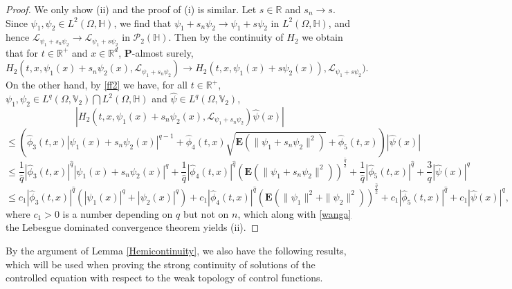 \documentclass[11pt]{article}
\newcommand{\be}{\begin{equation}}
\newcommand{\ee}{\end{equation}}
\numberwithin{equation}{section}
\begin{document}
\begin{proof}
We only show (ii) and the proof of (i) is
similar.
 Let $s\in\mathbb{R}$ and $s_n \to s$. Since
 $\psi_1,\psi_2\in
  L^2(\Omega, \mathbb{H})$, we find that
  $\psi_1+s_n  \psi_2
  \to \psi_1+s  \psi_2 $ in
  $L^2(\Omega, \mathbb{H})$,
and hence
  $\mathcal{L}_{
  \psi_1+s_n  \psi_2}
  \to
  \mathcal{L}_{
  \psi_1+s  \psi_2}$ in $\mathcal{P}_2 (\mathbb{H})$.
  Then by the continuity of
  $H_2$ we obtain that for  $t\in \mathbb{R}^+$
  and
  $x\in \mathbb{R}^d$,
  $\mathbf{P}$-almost surely,
\be\label{wanga}
  H_2 (t,x , \psi_1(x) +s_n  \psi_2(x),
  \mathcal{L}_{\psi_1+s_n  \psi_2})
  \to    H_2 (t,x , \psi_1(x)+s  \psi_2(x)  ),
  \mathcal{L}_{\psi_1+s  \psi_2 }).
\ee
On the other hand, by \eqref{ff2} we have, for all $t\in\mathbb{R}^+$,
  $\psi_1,\psi_2\in
  L^q(\Omega, \mathbb{V}_2)
  \bigcap
  L^2(\Omega, \mathbb{H})$
  and
    $\widehat{\psi} \in
    L^q(\Omega,  \mathbb{V}_2)$,
$$
\left | H_2 (t,x , \psi_1(x) +s_n  \psi_2(x),
  \mathcal{L}_{\psi_1+s_n  \psi_2})
  \widehat{\psi} (x)\right |
  $$
  $$
  \le
  \left (
   \widehat{\phi}_3 (t,x)
   |\psi_1(x) +s_n  \psi_2(x) |^{q-1}
   +
     \widehat{\phi}_4 (t,x)
     \sqrt{\mathbf{E}
     (\| \psi_1 +s_n  \psi_2\|^2)}
     +   \widehat{\phi}_5 (t,x)
  \right ) |   \widehat{\psi} (x)|
  $$
   $$
  \le
   {\frac 1{\widehat{q}}}
   |\widehat{\phi}_3 (t,x)|^{\widehat{q}}
   |\psi_1(x) +s_n  \psi_2(x) |^{q}
   +  {\frac 1{\widehat{q}}}
    | \widehat{\phi}_4 (t,x)|^{\widehat{q}}
    (  \mathbf{E}
       (\| \psi_1 +s_n  \psi_2\|^2) ) ^{\frac {\widehat{q}}2}
     +    {\frac 1{\widehat{q}}}
 |   \widehat{\phi}_5 (t,x)|^{\widehat{q}}
  +    {\frac 3{ {q}}}
   |   \widehat{\psi} (x)|^q
  $$
  $$
  \le
   c_1
   |\widehat{\phi}_3 (t,x)|^{\widehat{q}}
   (
   |\psi_1(x)|^q + | \psi_2(x) |^{q})
   + c_1
    | \widehat{\phi}_4 (t,x)|^{\widehat{q}}
    ( \mathbf{E}
     (\| \psi_1\|^2
      + \| \psi_2\|^2 ) ) ^{\frac {\widehat{q}}2}
     +   c_1
 |   \widehat{\phi}_5 (t,x)|^{\widehat{q}}
  +  c_1
   |   \widehat{\psi} (x)|^q,
  $$
  where $c_1>0$ is a number depending on $q$
  but not on $n$,
  which along with \eqref{wanga}
  the Lebesgue dominated convergence theorem
  yields (ii).
   \end{proof}


By the argument of  Lemma \ref{Hemicontinuity},
we also have the following results, which will be used
when proving the strong continuity of solutions
of the controlled equation with respect to
the weak topology of
control functions.
\end{document}
